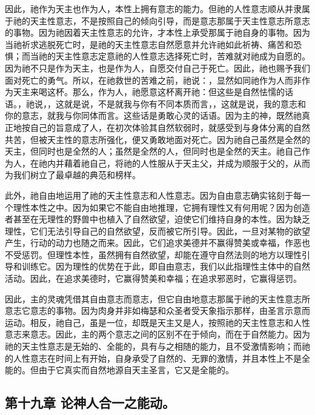 因此，祂作为天主也作为人，本性上拥有意志的能力。但祂的人性意志顺从并隶属于祂的天主性意志，不是按照自己的倾向引导，而是意志那属于天主性意志所意志的事物。因为祂因着天主性意志的允许，才本性上承受那属于祂自身的事物。因为当祂祈求逃脱死亡时，是祂的天主性意志自然愿意并允许祂如此祈祷、痛苦和恐惧；而当祂的天主性意志定意祂的人性意志选择死亡时，苦难就对祂成为自愿的。因为祂不只是作为天主，也是作为人，自愿交付自己于死亡。因此，祂也赐予我们面对死亡的勇气。所以，在祂救世的苦难之前，祂说：，显然如同祂作为人而非作为天主来喝这杯。那么，作为人，祂愿意这杯离开祂：但这些是自然怯懦的话语。，祂说，，这就是说，不是就我与你有不同本质而言，，这就是说，我的意志和你的意志，就我与你同体而言。这些话是勇敢心灵的话语。因为主的神，既然祂真正地按自己的旨意成了人，在初次体验其自然软弱时，就感受到与身体分离的自然共苦，但被天主性的意志所强化，便又勇敢地面对死亡。因为祂自己虽然是全然的天主，但同时也是全然的人；虽然是全然的人，但同时也是全然的天主。祂自己作为人，在祂内并藉着祂自己，将祂的人性服从于天主父，并成为顺服于父的，从而为我们树立了最卓越的典范和榜样。\par

此外，祂自由地运用了祂的天主性意志和人性意志。因为自由意志确实铭刻于每一个理性本性之中。因为如果它不能自由地推理，它拥有理性又有何用呢？因为创造者甚至在无理性的野兽中也植入了自然欲望，迫使它们维持自身的本性。因为缺乏理性，它们无法引导自己的自然欲望，反而被它所引导。因此，一旦对某物的欲望产生，行动的动力也随之而来。因此，它们追求美德并不赢得赞美或幸福，作恶也不受惩罚。但理性本性，虽然拥有自然欲望，却能在遵守自然法则的地方以理性引导和训练它。因为理性的优势在于此，即自由意志，我们以此指理性主体中的自然活动。因此，在追求美德时，它赢得赞美和幸福；在追求邪恶时，它赢得惩罚。\par

因此，主的灵魂凭借其自由意志而意志，但它自由地意志那属于祂的天主性意志所意志它意志的事物。因为肉身并非如梅瑟和众圣者受天象指示那样，由圣言示意而运动。相反，祂自己，虽是一位，却既是天主又是人，按照祂的天主性意志和人性意志来意志。因此，主的两个意志之间的区别不在于倾向，而在于自然能力。因为祂的天主性意志是无始的、全能的，具有与之相随的能力，且不受激情影响；而祂的人性意志在时间上有开始，自身承受了自然的、无罪的激情，并且本性上不是全能的。但由于它真实而自然地源自天主圣言，它又是全能的。\par


\subsection{第十九章 论神人合一之能动。}

